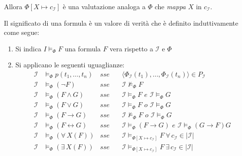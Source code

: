 \documentclass[italian, 10pt]{article}
\begin{document}
Allora \(\Phi[X \mapsto c_{\mathcal{I}}]\) è una valutazione analoga a \(\Phi\) che \textit{mappa} \(X\) in \(c_{\mathcal{I}}\).

Il significato di una formula è un valore di verità che è definito induttivamente come segue:

\begin{enumerate}
  \item Si indica \(I \vDash_\Phi F\) una formula \(F\) vera rispetto a \(\mathcal{I}\) e \(\Phi\)
  \item Si applicano le seguenti uguaglianze:
        \begin{align*}
          \mathcal{I} & \vDash_\Phi p(t_1, \ldots, t_n)   & \textit{sse} \quad & \langle \Phi_{\mathcal{I}}(t_1), \ldots,  \Phi_{\mathcal{I}}(t_n) \rangle \in P_{\mathcal{I}}          \\
          \mathcal{I} & \vDash_\Phi (\lnot F)             & \textit{sse} \quad & \mathcal{I} \nvDash_\Phi F                                                                             \\
          \mathcal{I} & \vDash_\Phi (F \land G)           & \textit{sse} \quad & \mathcal{I} \vDash_\Phi F \textit{ e } \mathcal{I} \vDash_\Phi G                                       \\
          \mathcal{I} & \vDash_\Phi (F \lor G)            & \textit{sse} \quad & \mathcal{I} \vDash_\Phi F \textit{ o } \mathcal{I} \vDash_\Phi G                                       \\
          \mathcal{I} & \vDash_\Phi (F \rightarrow G)     & \textit{sse} \quad & \mathcal{I} \nvDash_\Phi F \textit{ o } \mathcal{I} \vDash_\Phi G                                      \\
          \mathcal{I} & \vDash_\Phi (F \leftrightarrow G) & \textit{sse} \quad & \mathcal{I} \vDash_\Phi (F \rightarrow G)  \textit{ e } \mathcal{I} \vDash_\Phi (G \rightarrow F)    G \\
          \mathcal{I} & \vDash_\Phi (\forall \, X(F))     & \textit{sse} \quad & \mathcal{I} \vDash_{\Phi[X \mapsto c_{\mathcal{I}}]} F \  \forall \, c_{\mathcal{I}} \in |\mathcal{I}| \\
          \mathcal{I} & \vDash_\Phi (\exists \, X(F))     & \textit{sse} \quad & \mathcal{I} \vDash_{\Phi[X \mapsto c_{\mathcal{I}}]} F \  \exists \, c_{\mathcal{I}} \in |\mathcal{I}| \\
        \end{align*}
\end{enumerate}
\end{document}
